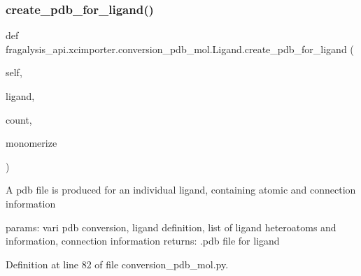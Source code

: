 \subsubsection{\texorpdfstring{create\+\_\+pdb\+\_\+for\+\_\+ligand()}{create\_pdb\_for\_ligand()}}
{\footnotesize\ttfamily def fragalysis\+\_\+api.\+xcimporter.\+conversion\+\_\+pdb\+\_\+mol.\+Ligand.\+create\+\_\+pdb\+\_\+for\+\_\+ligand (\begin{DoxyParamCaption}\item[{}]{self,  }\item[{}]{ligand,  }\item[{}]{count,  }\item[{}]{monomerize }\end{DoxyParamCaption})}

\begin{DoxyVerb}A pdb file is produced for an individual ligand, containing atomic and connection information

params: vari pdb conversion, ligand definition, list of ligand heteroatoms and information, connection information
returns: .pdb file for ligand
\end{DoxyVerb}
 

Definition at line 82 of file conversion\+\_\+pdb\+\_\+mol.\+py.


